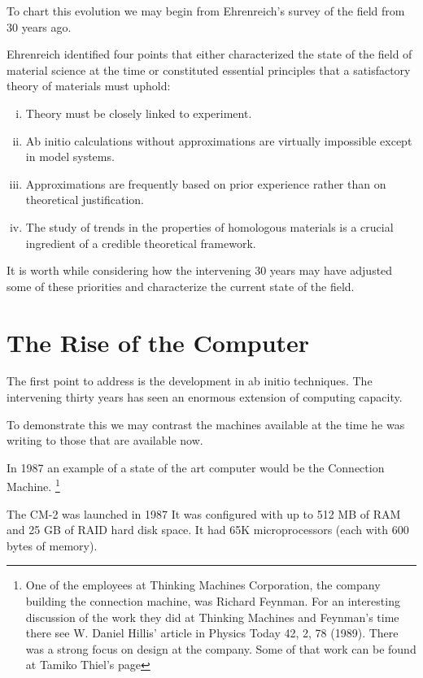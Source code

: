To chart this evolution we may begin from Ehrenreich's survey of the field from 30 years ago.

Ehrenreich identified four points that either characterized the state of the field of material science at the time
or constituted essential principles that a satisfactory theory of materials must uphold:
%
\begin{enumerate}[i)]
\item Theory must be closely linked to experiment.
\item Ab initio calculations without approximations are virtually impossible except in model systems.
\item Approximations are frequently based on prior experience rather than on theoretical justification.
\item The study of trends in the properties of homologous materials 
      is a crucial ingredient of a credible theoretical framework.
\end{enumerate}
%

It is worth while considering how the intervening 30 years may have adjusted some of 
these priorities and characterize the current state of the field.

\section{The Rise of the Computer}
The first point to address is the development in ab initio techniques.
The intervening thirty years has seen an enormous extension of computing capacity. 

To demonstrate this we may contrast the machines available at the time
he was writing to those that are available now. 

In 1987 an example of a state of the art computer would be the Connection Machine.
\footnote{One of the employees at Thinking Machines Corporation,
the company building the connection machine, was Richard Feynman.
For an interesting discussion of the work they
did at Thinking Machines and Feynman's time there see W. Daniel
Hillis' article in Physics Today 42, 2, 78 (1989).
There was a strong focus on design at the company. Some of that
work can be found at Tamiko Thiel's page}%

The CM-2 was launched in 1987 It was configured with up to 512 MB of RAM and 25 GB of RAID
hard disk space. It had 65K microprocessors (each with 600 bytes of memory). 

